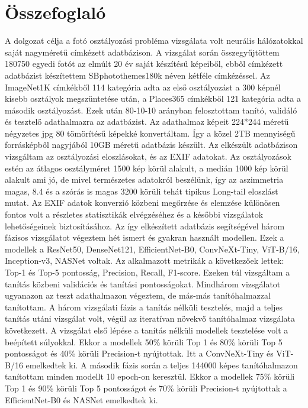 \chapter{Összefoglaló}
\label{ch:summary}

A dolgozat célja a fotó osztályozási probléma vizsgálata volt neurális hálózatokkal saját nagyméretű címkézett adatbázison. 
A vizsgálat során összegyűjtöttem 180750 egyedi fotót az elmúlt 20 év saját készítésű képeiből, ebből címkézett adatbázist készítettem SBphotothemes180k néven kétféle címkézéssel.
Az ImageNet1K címkékből 114 kategória adta az első osztályozást a 300 képnél kisebb osztályok megszüntetése után, a Places365 címkékből 121 kategória adta a második osztályozást. Ezek után 80-10-10 arányban felosztottam tanító, validáló és tesztelő adathalmazra az adatbázist. Az adathalmaz képeit 224*244 méretű négyzetes jpg 80 tömörítésű képekké konvertáltam. Így a közel 2TB mennyiségű forrásképből nagyjából 10GB méretű adatbázis készült.
Az elkészült adatbázison vizsgáltam az osztályozási eloszlásokat, és az EXIF adatokat. Az osztályozások estén az átlagos osztályméret 1500 kép körül alakult, a medián 1000 kép körül alakult ami jó, de mivel természetes adatokról beszélünk, így az aszimmetria magas, 8.4 és a szórás is magas 3200 körüli tehát tipikus Long-tail eloszlást mutat.
Az EXIF adatok konverzió közbeni megőrzése és elemzése különösen fontos volt a részletes statisztikák elvégzéséhez és a későbbi vizsgálatok lehetőségeinek biztosításához. 
Az így elkészített adatbázis segítségével három fázisos vizsgálatot végeztem hét ismert és gyakran használt modellen. Ezek a modellek a ResNet50, DenseNet121, EfficientNet-B0, ConvNeXt-Tiny, ViT-B/16, Inception-v3, NASNet voltak. 
Az alkalmazott metrikák a következőek lettek: Top-1 és Top-5 pontosság, Precision, Recall, F1-score. Ezeken túl vizsgáltam a tanítás közbeni validációs és tanítási pontosságokat.
Mindhárom vizsgálatot ugyanazon az teszt adathalmazon végeztem, de más-más tanítóhalmazzal tanítottam. A három vizsgálati fázis a tanítás nélküli tesztelés, majd a teljes tanítás utáni vizsgálat volt, végül az iteratívan növekvő tanítóhalmaz vizsgálata következett. 
A vizsgálat első lépése a tanítás nélküli modellek tesztelése volt a beépített súlyokkal. Ekkor a modellek 50\% körüli Top 1 és 80\% körüli Top 5 pontosságot és 40\% körüli Precision-t nyújtottak. Itt a ConvNeXt-Tiny és ViT-B/16 emelkedtek ki.
A második fázis során a teljes 144000 képes tanítóhalmazon tanítottam minden modellt 10 epoch-on keresztül. Ekkor a modellek 75\% körüli Top 1 és 90\% körüli Top 5 pontosságot és 70\% körüli Precision-t nyújtottak a EfficientNet-B0 és NASNet emelkedtek ki.
